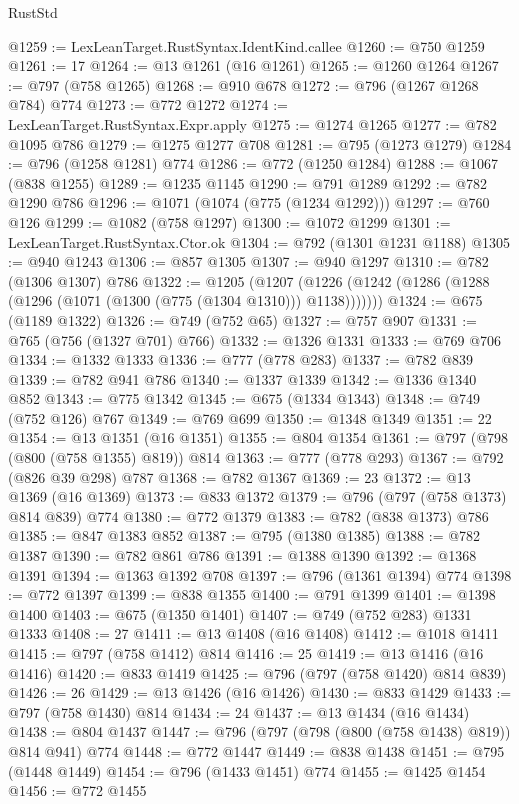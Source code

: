 \begin{lexlean}{RustStd}
\begin{coremodule}
{\begin{coremodule}
{{{{{{{{{{{{{{@1259 := LexLeanTarget.RustSyntax.IdentKind.callee
@1260 := @750 @1259
@1261 := 17
@1264 := @13 @1261 (@16 @1261)
@1265 := @1260 @1264
@1267 := @797 (@758 @1265)
@1268 := @910 @678
@1272 := @796 (@1267 @1268 @784) @774
@1273 := @772 @1272
@1274 := LexLeanTarget.RustSyntax.Expr.apply
@1275 := @1274 @1265
@1277 := @782 @1095 @786
@1279 := @1275 @1277 @708
@1281 := @795 (@1273 @1279)
@1284 := @796 (@1258 @1281) @774
@1286 := @772 (@1250 @1284)
@1288 := @1067 (@838 @1255)
@1289 := @1235 @1145
@1290 := @791 @1289
@1292 := @782 @1290 @786
@1296 := @1071 (@1074 (@775 (@1234 @1292)))
@1297 := @760 @126
@1299 := @1082 (@758 @1297)
@1300 := @1072 @1299
@1301 := LexLeanTarget.RustSyntax.Ctor.ok
@1304 := @792 (@1301 @1231 @1188)
@1305 := @940 @1243
@1306 := @857 @1305
@1307 := @940 @1297
@1310 := @782 (@1306 @1307) @786
@1322 := @1205
    (@1207 (@1226 (@1242 (@1286 (@1288 (@1296 (@1071 (@1300 (@775 (@1304 @1310))) @1138)))))))
@1324 := @675 (@1189 @1322)
@1326 := @749 (@752 @65)
@1327 := @757 @907
@1331 := @765 (@756 (@1327 @701) @766)
@1332 := @1326 @1331
@1333 := @769 @706
@1334 := @1332 @1333
@1336 := @777 (@778 @283)
@1337 := @782 @839
@1339 := @782 @941 @786
@1340 := @1337 @1339
@1342 := @1336 @1340 @852
@1343 := @775 @1342
@1345 := @675 (@1334 @1343)
@1348 := @749 (@752 @126) @767
@1349 := @769 @699
@1350 := @1348 @1349
@1351 := 22
@1354 := @13 @1351 (@16 @1351)
@1355 := @804 @1354
@1361 := @797 (@798 (@800 (@758 @1355) @819)) @814
@1363 := @777 (@778 @293)
@1367 := @792 (@826 @39 @298) @787
@1368 := @782 @1367
@1369 := 23
@1372 := @13 @1369 (@16 @1369)
@1373 := @833 @1372
@1379 := @796 (@797 (@758 @1373) @814 @839) @774
@1380 := @772 @1379
@1383 := @782 (@838 @1373) @786
@1385 := @847 @1383 @852
@1387 := @795 (@1380 @1385)
@1388 := @782 @1387
@1390 := @782 @861 @786
@1391 := @1388 @1390
@1392 := @1368 @1391
@1394 := @1363 @1392 @708
@1397 := @796 (@1361 @1394) @774
@1398 := @772 @1397
@1399 := @838 @1355
@1400 := @791 @1399
@1401 := @1398 @1400
@1403 := @675 (@1350 @1401)
@1407 := @749 (@752 @283) @1331 @1333
@1408 := 27
@1411 := @13 @1408 (@16 @1408)
@1412 := @1018 @1411
@1415 := @797 (@758 @1412) @814
@1416 := 25
@1419 := @13 @1416 (@16 @1416)
@1420 := @833 @1419
@1425 := @796 (@797 (@758 @1420) @814 @839)
@1426 := 26
@1429 := @13 @1426 (@16 @1426)
@1430 := @833 @1429
@1433 := @797 (@758 @1430) @814
@1434 := 24
@1437 := @13 @1434 (@16 @1434)
@1438 := @804 @1437
@1447 := @796 (@797 (@798 (@800 (@758 @1438) @819)) @814 @941) @774
@1448 := @772 @1447
@1449 := @838 @1438
@1451 := @795 (@1448 @1449)
@1454 := @796 (@1433 @1451) @774
@1455 := @1425 @1454
@1456 := @772 @1455
}}}}}}}}}}}}}}
\end{coremodule}}
\end{coremodule}
\end{lexlean}
